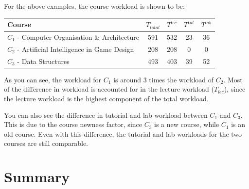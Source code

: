 For the above examples, the course workload is shown to be:

\begin{table}[ht]
  \centering
  \begin{tabular}{|l|c|c|c|c|}
    \hline
    \textbf{Course}                                  & \(T_{total}\) & \(T^{lec}\) & \(T^{tut}\) & \(T^{lab}\) \\\hline
    \(C_1\) - Computer Organisation \& Architecture  & 591           & 532         & 23          & 36          \\\hline
    \(C_2\) - Artificial Intelligence in Game Design & 208           & 208         & 0           & 0           \\\hline
    \(C_3\) - Data Structures                        & 493           & 403         & 39          & 52          \\\hline
  \end{tabular}
\end{table}

As you can see, the workload for \(C_1\) is around 3 times the workload of \(C_2\). Most of the difference in workload is accounted for in the lecture workload (\(T_{lec}\)), since the lecture workload is the highest component of the total workload.

You can also see the difference in tutorial and lab workload between \(C_1\) and \(C_3\). This is due to the course newness factor, since \(C_3\) is a new course, while \(C_1\) is an old course. Even with this difference, the tutorial and lab workloads for the two courses are still comparable.

\section{Summary}
